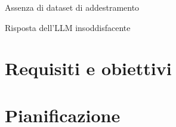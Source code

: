 \begin{risk}{Assenza di dataset di addestramento}
    \label{risk:dataset-absence} 
\end{risk}

\begin{risk}{Risposta dell'LLM insoddisfacente}
    \label{risk:bad-llm-response} 
\end{risk}

\section{Requisiti e obiettivi}


\section{Pianificazione}
